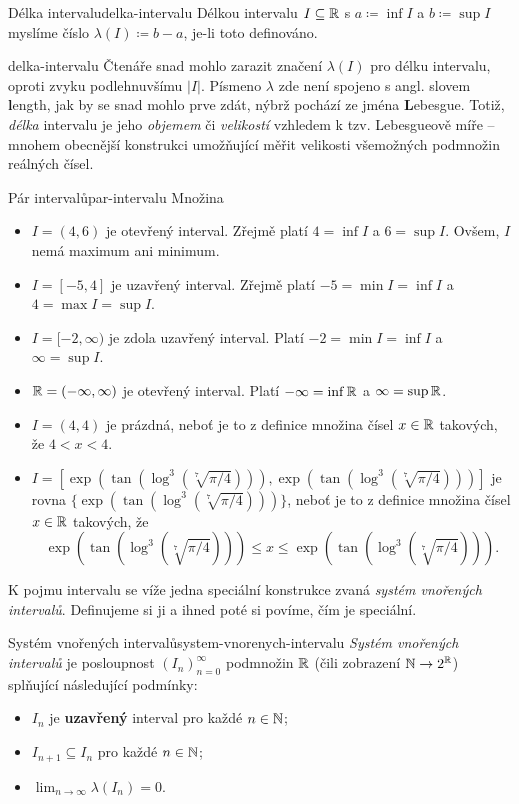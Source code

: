 \begin{definition}{Délka intervalu}{delka-intervalu}
 Délkou intervalu $I \subseteq \mathbb{R}$ s $a \coloneqq \inf I$ a $b \coloneqq \sup I$
 myslíme číslo $\lambda(I) \coloneqq b - a$, je-li toto definováno.
\end{definition}

\begin{remark}{}{delka-intervalu}
 Čtenáře snad mohlo zarazit značení $\lambda(I)$ pro délku intervalu, oproti
 zvyku podlehnuvšímu $|I|$. Písmeno $\lambda$ zde není spojeno s angl. slovem
 \textbf{l}ength, jak by se snad mohlo prve zdát, nýbrž pochází ze jména
 \textbf{L}ebesgue. Totiž, \emph{délka} intervalu je jeho \emph{objemem} či
 \emph{velikostí} vzhledem k tzv. Lebesgueově míře -- mnohem obecnější
 konstrukci umožňující měřit velikosti všemožných podmnožin reálných čísel.
\end{remark}

\begin{example}{Pár intervalů}{par-intervalu}
 Množina
 \begin{itemize}
  \item $I = (4,6)$ je otevřený interval. Zřejmě platí $4 = \inf I$ a $6 = \sup
   I$. Ovšem, $I$ nemá maximum ani minimum.
  \item $I = [-5,4]$ je uzavřený interval. Zřejmě platí $-5 = \min I = \inf I$ a
   $4 = \max I = \sup I$.
  \item $I = [-2,\infty)$ je zdola uzavřený interval. Platí $-2 = \min I = \inf
   I$ a $\infty = \sup I$.
  \item $\mathbb{R} = (-\infty,\infty)$ je otevřený interval. Platí $-\infty = \inf \mathbb{R}$
   a $\infty = \sup \mathbb{R}$.
  \item $I = (4,4)$ je prázdná, neboť je to z definice množina čísel $x \in \mathbb{R}$
   takových, že $4 < x < 4$.
  \item $I = [\exp(\tan(\log^{3}(\sqrt[7]{\pi /
   4}))),\exp(\tan(\log^{3}(\sqrt[7]{\pi / 4})))]$ je rovna
   $\{\exp(\tan(\log^{3}(\sqrt[7]{\pi / 4})))\}$, neboť je to z definice množina
   čísel $x \in \mathbb{R}$ takových, že
   \[
    \exp(\tan(\log^{3}(\sqrt[7]{\pi / 4}))) \leq x \leq
    \exp(\tan(\log^{3}(\sqrt[7]{\pi / 4}))).
   \]
 \end{itemize}
\end{example}

K pojmu intervalu se víže jedna speciální konstrukce zvaná \emph{systém
vnořených intervalů}. Definujeme si ji a ihned poté si povíme, čím je speciální.

\begin{definition}{Systém vnořených intervalů}{system-vnorenych-intervalu}
 \emph{Systém vnořených intervalů} je posloupnost $(I_n)_{n=0}^{\infty}$
 podmnožin $\mathbb{R}$ (čili zobrazení $\mathbb{N} \to 2^{\mathbb{R}}$) splňující následující podmínky:
 \begin{itemize}
  \item $I_n$ je \textbf{uzavřený} interval pro každé $n \in \mathbb{N}$;
  \item $I_{n+1} \subseteq I_n$ pro každé $n \in \mathbb{N}$;
  \item $\lim_{n \to \infty} \lambda(I_n) = 0$.
 \end{itemize}
\end{definition}

